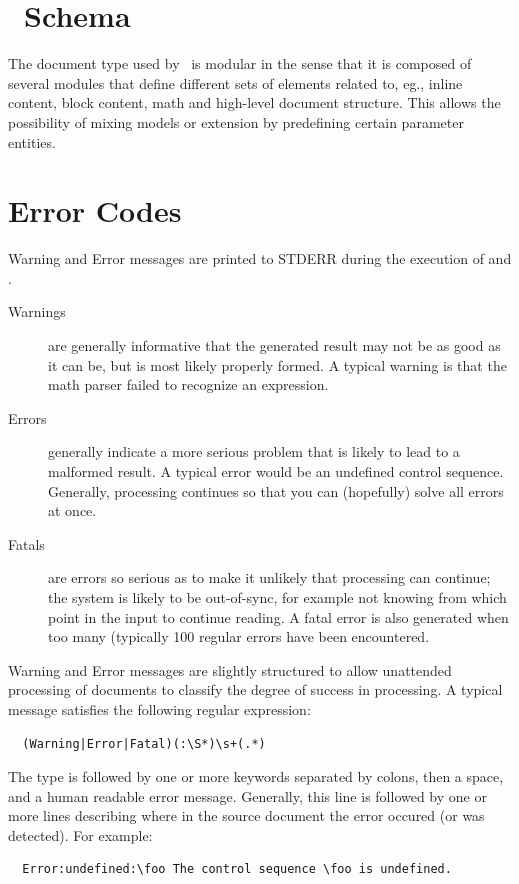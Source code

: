 \documentclass{book}
\begin{document}
\chapter[Schema]{\LaTeXML\ Schema}\label{schema}
The document type used by \LaTeXML\ is modular in the sense
that it is composed of several modules that define different
sets of elements related to, eg., inline content, block content,
math and high-level document structure.  This allows the possibility
of mixing models or extension by predefining certain parameter entities.



\chapter{Error Codes}\label{errorcodes}
Warning and Error messages are printed to STDERR during the execution
of  and .
\begin{description}
\item[Warnings] are generally
informative that the generated result may not be as good as it can be,
but is most likely properly formed.  A typical warning is that
the math parser failed to recognize an expression.
\item[Errors] generally indicate a more serious problem that is likely
to lead to a malformed result.  A typical error would be an undefined
control sequence.  Generally, processing continues so that you can
(hopefully) solve all errors at once.
\item[Fatals] are errors so serious as to make it unlikely that processing
can continue; the system is likely to be out-of-sync, for example
not knowing from which  point in the input to continue reading.
A fatal error is also generated when too many (typically 100 regular errors
have been encountered.
\end{description}

Warning and Error messages are slightly structured to allow
unattended processing of documents to classify the degree
of success in processing. A typical message satisfies the following regular expression:
\begin{verbatim}
  (Warning|Error|Fatal)(:\S*)\s+(.*)
\end{verbatim}
The type is followed by one or more keywords separated by colons,
then a space, and a human readable error message.
Generally, this line is followed by one or more lines describing
where in the source document the error occured (or was detected).
For example:
\begin{verbatim}
  Error:undefined:\foo The control sequence \foo is undefined.
\end{verbatim}
\end{document}
